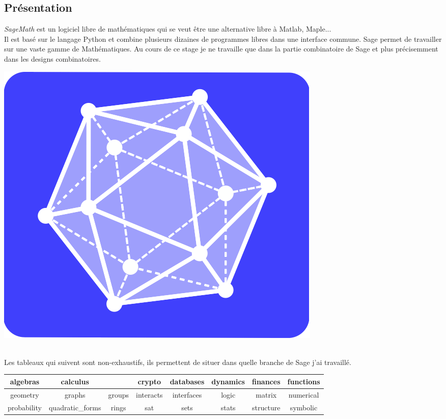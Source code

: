 \documentclass[a4paper]{article}
\begin{document}
\subsection{Présentation}
\begin{minipage}{0.6\linewidth}
  \textit{SageMath} est un logiciel libre de mathématiques qui se veut être une alternative libre à Matlab, Maple...\medskip\\
  Il est basé sur le langage Python et combine plusieurs dizaines de programmes libres dans une interface commune. Sage permet de travailler sur une vaste gamme de Mathématiques. Au cours de ce stage je ne travaille que dans la partie combinatoire de Sage et plus précisemment dans les designs combinatoires.
\end{minipage}\hfill
\begin{minipage}{0.3\linewidth}
\includegraphics[scale=0.4]{logo.png}  
\end{minipage}
\bigskip\\
Les tableaux qui suivent sont non-exhaustifs, ils permettent de situer dans quelle branche de Sage j'ai travaillé.\smallskip\\
\begin{tabular}{|c|c|c|c|c|c|c|c|}
  \hline
  algebras & calculus & \cellcolor{lightgray}\color{white}{combinat} & crypto & databases & dynamics & finances & functions\\
  \hline
  geometry & graphs & groups & interacts & interfaces & logic & matrix & numerical\\
  \hline
  probability & quadratic\_forms & rings & sat & sets & stats & structure & symbolic\\
  \hline
\end{tabular}
\end{document}
